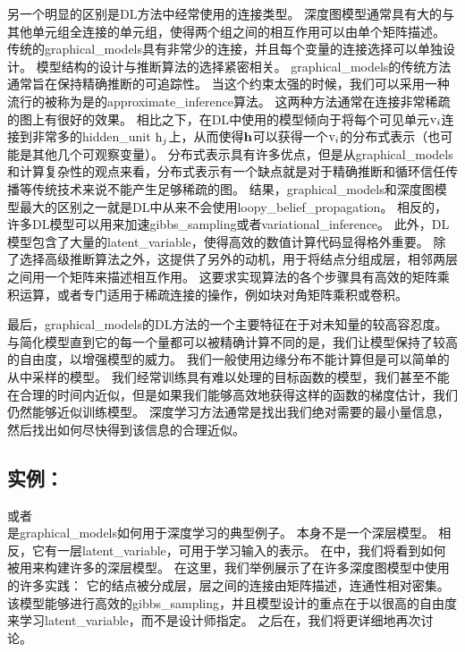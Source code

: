 另一个明显的区别是\gls{DL}方法中经常使用的连接类型。
深度图模型通常具有大的与其他单元组全连接的单元组，使得两个组之间的相互作用可以由单个矩阵描述。
传统的\gls{graphical_models}具有非常少的连接，并且每个变量的连接选择可以单独设计。
模型结构的设计与推断算法的选择紧密相关。
\gls{graphical_models}的传统方法通常旨在保持精确推断的可追踪性。
当这个约束太强的时候，我们可以采用一种流行的被称为是的\gls{approximate_inference}算法。
这两种方法通常在连接非常稀疏的图上有很好的效果。
相比之下，在\gls{DL}中使用的模型倾向于将每个可见单元$\mathrm{v}_i$连接到非常多的\gls{hidden_unit} $\mathrm{h}_j$上，从而使得$\mathbf{h}$可以获得一个$\mathrm{v}_i$的分布式表示（也可能是其他几个可观察变量）。
分布式表示具有许多优点，但是从\gls{graphical_models}和计算复杂性的观点来看，分布式表示有一个缺点就是对于精确推断和循环信任传播等传统技术来说不能产生足够稀疏的图。
结果，\gls{graphical_models}和深度图模型最大的区别之一就是\gls{DL}中从来不会使用\gls{loopy_belief_propagation}。
相反的，许多\gls{DL}模型可以用来加速\gls{gibbs_sampling}或者\gls{variational_inference}。
此外，\gls{DL}模型包含了大量的\gls{latent_variable}，使得高效的数值计算代码显得格外重要。
除了选择高级推断算法之外，这提供了另外的动机，用于将结点分组成层，相邻两层之间用一个矩阵来描述相互作用。
这要求实现算法的各个步骤具有高效的矩阵乘积运算，或者专门适用于稀疏连接的操作，例如块对角矩阵乘积或卷积。



最后，\gls{graphical_models}的\gls{DL}方法的一个主要特征在于对未知量的较高容忍度。
与简化模型直到它的每一个量都可以被精确计算不同的是，我们让模型保持了较高的自由度，以增强模型的威力。
我们一般使用边缘分布不能计算但是可以简单的从中采样的模型。
我们经常训练具有难以处理的目标函数的模型，我们甚至不能在合理的时间内近似，但是如果我们能够高效地获得这样的函数的梯度估计，我们仍然能够近似训练模型。
深度学习方法通常是找出我们绝对需要的最小量信息，然后找出如何尽快得到该信息的合理近似。



\subsection{实例：}
\label{sec:example_the_restricted_boltzmann_machine}
\citep{Smolensky86}或者\\ 是\gls{graphical_models}如何用于深度学习的典型例子。 
本身不是一个深层模型。 
相反，它有一层\gls{latent_variable}，可用于学习输入的表示。 
在中，我们将看到如何被用来构建许多的深层模型。
在这里，我们举例展示了在许多深度图模型中使用的许多实践：
它的结点被分成层，层之间的连接由矩阵描述，连通性相对密集。
该模型能够进行高效的\gls{gibbs_sampling}，并且模型设计的重点在于以很高的自由度来学习\gls{latent_variable}，而不是设计师指定。
之后在，我们将更详细地再次讨论。

